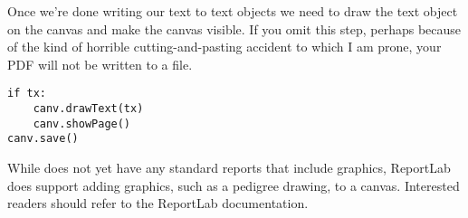 Once we're done writing our text to text objects we need to draw the text object on the canvas and make the canvas visible.  If you omit this step, perhaps because of the kind of horrible cutting-and-pasting accident to which I am prone, your PDF will not be written to a file.
\begin{verbatim}
if tx:
    canv.drawText(tx)
    canv.showPage()
canv.save()
\end{verbatim}
While \PyPedal{} does not yet have any standard reports that include graphics, ReportLab does support adding graphics, such as a pedigree drawing, to a canvas.  Interested readers should refer to the ReportLab documentation.